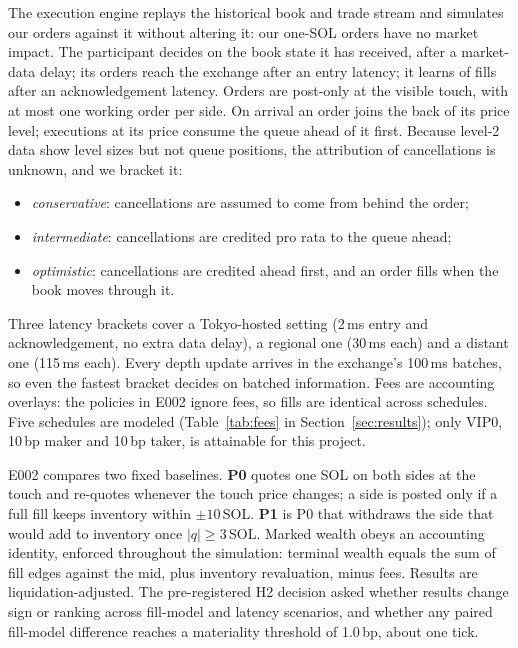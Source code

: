 \documentclass[11pt]{article}
\makeatletter
\newcommand{\bp}{\,bp}
\renewcommand\subsection{\@startsection{subsection}{2}{\z@}{-3ex\@plus -1ex \@minus -.2ex}{1ex \@plus .2ex}{\normalfont\normalsize\bfseries}}
\makeatother
\begin{document}
The execution engine replays the historical book and trade stream and simulates our orders against it without
altering it: our one-SOL orders have no market impact. The participant decides on the book state it has received, after
a market-data delay; its orders reach the exchange after an entry latency; it learns of fills after an acknowledgement
latency. Orders are post-only at the visible touch, with at most one working order per side. On arrival an order joins
the back of its price level; executions at its price consume the queue ahead of it first. Because level-2 data show
level sizes but not queue positions, the attribution of cancellations is unknown, and we bracket it:
\begin{itemize}
  \item \emph{conservative}: cancellations are assumed to come from behind the order;
  \item \emph{intermediate}: cancellations are credited pro rata to the queue ahead;
  \item \emph{optimistic}: cancellations are credited ahead first, and an order fills when the book moves through it.
\end{itemize}
Three latency brackets cover a Tokyo-hosted setting (2\,ms entry and acknowledgement, no extra data delay), a
regional one (30\,ms each) and a distant one (115\,ms each). Every depth update arrives in the exchange's 100\,ms
batches, so even the fastest bracket decides on batched information. Fees are accounting overlays: the policies in E002
ignore fees, so fills are identical across schedules. Five schedules are modeled (Table~\ref{tab:fees} in
Section~\ref{sec:results}); only VIP0, 10\bp{} maker and 10\bp{} taker, is attainable for this project.

E002 compares two fixed baselines. \textbf{P0} quotes one SOL on both sides at the touch and re-quotes whenever the touch
price changes; a side is posted only if a full fill keeps inventory within $\pm10$\,SOL. \textbf{P1} is P0 that withdraws
the side that would add to inventory once $|q|\ge3$\,SOL. Marked wealth obeys an accounting identity, enforced throughout the
simulation: terminal wealth equals the sum of fill edges against the mid, plus inventory revaluation, minus fees. Results are
liquidation-adjusted. The pre-registered H2 decision asked whether results change sign or ranking across fill-model and
latency scenarios, and whether any paired fill-model difference reaches a materiality threshold of 1.0\bp, about one
tick.

\subsection{Forecasts, quoting policies and E003}\label{sec:e003}
\end{document}

